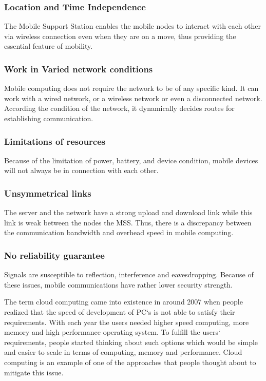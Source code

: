 \documentclass[10pt, conference, compsocconf]{IEEEtran}
\begin{document}
\subsubsection{Location and Time Independence}
The Mobile Support Station enables the mobile nodes to interact with each other via wireless connection even when they are on a move, thus providing the essential feature of mobility.
\subsubsection{Work in Varied network conditions}
Mobile computing does not require the network to be of any specific kind. It can work with a wired network, or a wireless network or even a disconnected network. According the condition of the network, it dynamically decides routes for establishing communication.
\subsubsection{Limitations of resources}
Because of the limitation of power, battery, and device condition, mobile devices will not always be in connection with each other.
\subsubsection{Unsymmetrical links}
The server and the network have a strong upload and download link while this link is weak between the nodes the MSS. Thus, there is a discrepancy between the communication bandwidth and overhead speed in mobile computing.
\subsubsection{No reliability guarantee}
Signals are susceptible to reflection, interference and eavesdropping. Because of these issues, mobile communications have rather lower security strength.

The term cloud computing came into existence in around 2007 when people realized that the speed of development of PC`s is not able to satisfy their requirements. With each year the users needed higher speed computing, more memory and high performance operating system. To fulfill the users` requirements, people started thinking about such options which would be simple and easier to scale in terms of computing, memory and performance. Cloud computing is an example of one of the approaches that people thought about to mitigate this issue.
\end{document}
